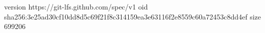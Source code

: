 version https://git-lfs.github.com/spec/v1
oid sha256:3e25ad30cf10dd8d5c69f21f8c314159ea3e63116f2e8559c60a72453c8dd4ef
size 699206
